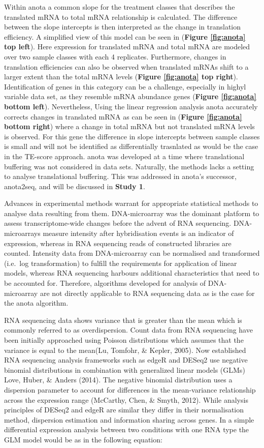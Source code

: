 \documentclass[
  12pt,
  openany]{book}
\begin{document}
Within anota a common slope for the treatment classes that describes the translated mRNA to total mRNA relationship is calculated. The difference between the slope intercepts is then interpreted as the change in translation efficiency. A simplified view of this model can be seen in (\textbf{Figure \ref{fig:anota} top left}). Here expression for translated mRNA and total mRNA are modeled over two sample classes with each 4 replicates. Furthermore, changes in translation efficiencies can also be observed when translated mRNAs shift to a larger extent than the total mRNA levels (\textbf{Figure \ref{fig:anota} top right}). Identification of genes in this category can be a challenge, especially in highyl variable data set, as they resemble mRNA abundance genes (\textbf{Figure \ref{fig:anota} bottom left}). Nevertheless, Using the linear regression analysis anota accurately corrects changes in translated mRNA as can be seen in (\textbf{Figure \ref{fig:anota} bottom right}) where a change in total mRNA but not translated mRNA levels is observed. For this gene the difference in slope intercepts between sample classes is small and will not be identified as differentially trasnlated as would be the case in the TE-score approach. anota was developed at a time where translational buffering was not considered in data sets. Naturally, the methods lacks a setting to analyse translational buffering. This was addressed in anota's successor, anota2seq, and will be discussed in \textbf{Study 1}.

Advances in experimental methods warrant for appropriate statistical methods to analyse data resulting from them. DNA-microarray was the dominant platform to assess transcriptome-wide changes before the advent of RNA sequencing. DNA-microarrays measure intensity after hybridisation events is an indicator of expression, whereas in RNA sequencing reads of constructed libraries are counted. Intensity data from DNA-microarray can be normalised and transformed (i.e.~log transformation) to fulfill the requirements for application of linear models, whereas RNA sequencing harbours additional characteristics that need to be accounted for. Therefore, algorithms developed for analysis of DNA- microarray are not directly applicable to RNA sequencing data as is the case for the anota algorithm.

RNA sequencing data shows variance that is greater than the mean which is commonly referred to as overdispersion. Count data from RNA sequencing have been initially approached using Poisson distributions which assumes that the variance is equal to the mean(Lu, Tomfohr, \& Kepler, 2005). Now established RNA sequencing analysis frameworks such as edgeR and DESeq2 use negative binomial distributions in combination with generalized linear models (GLMs) Love, Huber, \& Anders (2014). The negative binomial distribution uses a dispersion parameter to account for differences in the mean-variance relationship across the expression range (McCarthy, Chen, \& Smyth, 2012). While analysis principles of DESeq2 and edgeR are similar they differ in their normalisation method, dispersion estimation and information sharing across genes. In a simple differential expression analysis between two conditions with one RNA type the GLM model would be as in the following equation:
\end{document}
